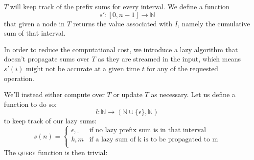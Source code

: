 \documentclass{article}
\begin{document}
$T$ will keep track of the prefix sums for every interval.
We define a function
\begin{equation}
    s': [0, n - 1] \to \mathbb{N}
\end{equation}
that given a node in $T$ returns the value associated with $I$, namely the
cumulative sum of that interval.

In order to reduce the computational cost, we introduce a lazy algorithm
that doesn't propagate sums over $T$ as they are streamed in the input,
which means $s'(i)$ might not be accurate at a given time $t$ for any of the
requested operation.

We'll instead either compute over $T$ or update $T$ as necessary.
Let us define a function to do so:
\begin{equation}
    l: \mathbb{N} \to (\mathbb{N} \cup \{\epsilon\}, \mathbb{N})
\end{equation}
to keep track of our lazy sums:
\begin{equation*}
    s(n) = \begin{cases}
            \epsilon, \_            &   \textrm{if no lazy prefix sum is in that interval} \\
            k, m                    &   \textrm{if a lazy sum of k is to be propagated to m}\\
            \end{cases}
\end{equation*}
The \textsc{query} function is then trivial:
\end{document}
